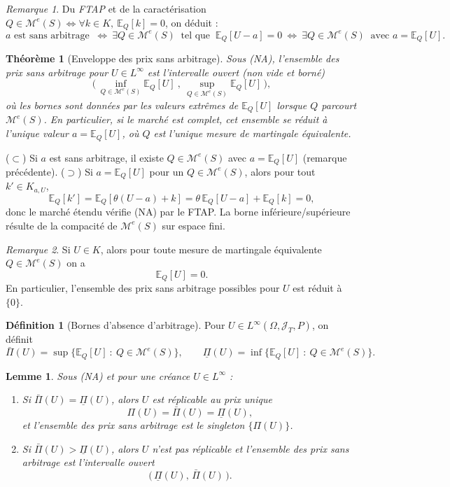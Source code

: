 \documentclass[12pt,a4paper]{article}
\makeatletter
\numberwithin{equation}{section}
\theoremstyle{plain} %
\newtheorem{theoreme}{Théorème}              %
\newtheorem{lemme}{Lemme}
\theoremstyle{definition} %
\newtheorem{definition}{Définition}          %
\theoremstyle{remark} %
\newtheorem*{remarque}{Remarque}
\theoremstyle{myexample}
\theoremstyle{definition}
\renewenvironment{proof}[1][\proofname]{%
  \par\vspace{0.8em}%
  \pushQED{\qed}%
  \normalfont\color{cyan}%
  \topsep6\p@\@plus6\p@\relax
  \trivlist
  \item[\hskip\labelsep\bfseries\color{cyan}#1\@addpunct{.}]\ignorespaces
}{%
  \popQED\endtrivlist\vspace{0.8em}%
}
\newcommand{\E}{\mathbb{E}}
\makeatother
\begin{document}
\begin{remarque}
Du \emph{FTAP} et de la caractérisation $Q\in\mathcal{M}^e(S)\iff \forall k\in K,\ \E_Q[k]=0$, on déduit :
\[
a \text{ est sans arbitrage } \ \Longleftrightarrow\ \exists Q\in\mathcal{M}^e(S)\ \text{ tel que }\ \E_Q[U-a]=0
\ \Longleftrightarrow\ \exists Q\in\mathcal{M}^e(S)\ \text{ avec } a=\E_Q[U].
\]
\end{remarque}

\begin{theoreme}[Enveloppe des prix sans arbitrage]
\label{thm:intervalle_prix_NA}
Sous (NA), l’ensemble des prix sans arbitrage pour $U\in L^\infty$ est l’intervalle ouvert (non vide et borné)
\[
\big(\, \inf_{Q\in\mathcal{M}^e(S)} \E_Q[U]\ ,\ \sup_{Q\in\mathcal{M}^e(S)} \E_Q[U] \,\big),
\]
où les bornes sont données par les valeurs extrêmes de $\E_Q[U]$ lorsque $Q$ parcourt $\mathcal{M}^e(S)$.
En particulier, si le marché est complet, cet ensemble se réduit à l’unique valeur $a=\E_Q[U]$, où $Q$ est l’unique mesure de martingale équivalente.
\end{theoreme}

\begin{proof}[Idée de preuve]
($\subset$) Si $a$ est sans arbitrage, il existe $Q\in\mathcal{M}^e(S)$ avec $a=\E_Q[U]$ (remarque précédente).  
($\supset$) Si $a=\E_Q[U]$ pour un $Q\in\mathcal{M}^e(S)$, alors pour tout $k'\in K_{a,U}$,
\[
\E_Q[k'] = \E_Q[\theta(U-a)+k]= \theta\,\E_Q[U-a]+\E_Q[k]=0,
\]
donc le marché étendu vérifie (NA) par le FTAP.  
La borne inférieure/supérieure résulte de la compacité de $\mathcal{M}^e(S)$ sur espace fini.
\end{proof}



\begin{remarque}\label{rq:UinK_implique_0}
Si $U\in K$, alors pour toute mesure de martingale équivalente $Q\in\mathcal{M}^e(S)$ on a
\[
\E_Q[U]=0.
\]
En particulier, l’ensemble des prix sans arbitrage possibles pour $U$ est réduit à $\{0\}$.
\end{remarque}

\begin{definition}[Bornes d’absence d’arbitrage]
Pour $U\in L^\infty(\Omega,\mathcal{J}_T,P)$, on définit
\[
\bar\Pi(U)=\sup\{\E_Q[U]\ :\ Q\in\mathcal{M}^e(S)\}, \qquad
\underline{\Pi}(U)=\inf\{\E_Q[U]\ :\ Q\in\mathcal{M}^e(S)\}.
\]
\end{definition}

\begin{lemme}\label{lem:replicabilite_intervalle_prix}
Sous (NA) et pour une créance $U\in L^\infty$ :
\begin{enumerate}
\item[(a)] Si $\bar\Pi(U)=\underline{\Pi}(U)$, alors $U$ est réplicable au prix unique
\[
\Pi(U)=\bar\Pi(U)=\underline{\Pi}(U),
\]
et l’ensemble des prix sans arbitrage est le singleton $\{\Pi(U)\}$.
\item[(b)] Si $\bar\Pi(U)>\underline{\Pi}(U)$, alors $U$ n’est pas réplicable et
l’ensemble des prix sans arbitrage est l’intervalle ouvert
\[
\big(\,\underline{\Pi}(U),\,\bar\Pi(U)\,\big).
\]
\end{enumerate}
\end{lemme}
\end{document}
